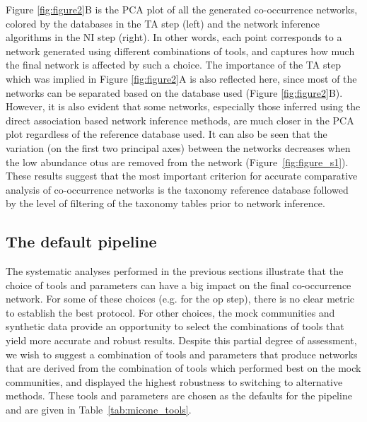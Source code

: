   Figure \ref{fig:figure2}B is the PCA plot of all the generated co-occurrence networks, colored by the databases in the TA step (left) and the network inference algorithms in the NI step (right).
  In other words, each point corresponds to a network generated using different combinations of tools, and captures how much the final network is affected by such a choice.
  The importance of the TA step which was implied in Figure \ref{fig:figure2}A is also reflected here, since most of the networks can be separated based on the database used (Figure \ref{fig:figure2}B).
  However, it is also evident that some networks, especially those inferred using the direct association based network inference methods, are much closer in the PCA plot regardless of the reference database used.
  It can also be seen that the variation (on the first two principal axes) between the networks decreases when the low abundance \ac{otu}s are removed from the network (Figure~\ref{fig:figure_s1}).
  These results suggest that the most important criterion for accurate comparative analysis of co-occurrence networks is the taxonomy reference database followed by the level of filtering of the taxonomy tables prior to network inference.

  \FloatBarrier

  \subsection*{The default pipeline}

  The systematic analyses performed in the previous sections illustrate that the choice of tools and parameters can have a big impact on the final co-occurrence network.
  For some of these choices (e.g. for the \ac{op} step), there is no clear metric to establish the best protocol.
  For other choices, the mock communities and synthetic data provide an opportunity to select the combinations of tools that yield more accurate and robust results.
  Despite this partial degree of assessment, we wish to suggest a combination of tools and parameters that produce networks that are derived from the combination of tools which performed best on the mock communities, and displayed the highest robustness to switching to alternative methods.
  These tools and parameters are chosen as the defaults for the pipeline and are given in Table~\ref{tab:micone_tools}.

